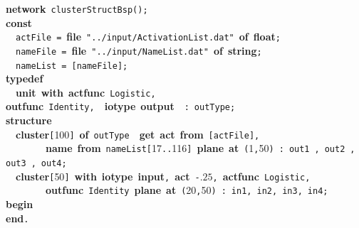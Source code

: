 {\bf network}~\verb&clusterStructBsp&\verb&(&\verb&)&\verb&;&\\[.3cm]
{\bf const}\\[.15cm]
~~\verb&actFile&~\verb&=&~{\bf file}~\verb&"../input/ActivationList.dat"&~{\bf of}~{\bf float}\verb&;&\\[.15cm]
~~\verb&nameFile&~\verb&=&~{\bf file}~\verb&"../input/NameList.dat"&~{\bf of}~{\bf string}\verb&;&\\[.15cm]
~~\verb&nameList&~\verb&=&~\verb&[&\verb&nameFile&\verb&]&\verb&;&\\[.3cm]
{\bf typedef}\\[.15cm]
~~{\bf unit}~{\bf with}~{\bf actfunc}~\verb&Logistic&\verb&,&~~{\bf
outfunc}~\verb&Identity&\verb&,&~~{\bf iotype}~{\bf output}~~\verb&:&~\verb&outType&\verb&;&\\[.3cm]
{\bf structure}\\[.15cm]
~~{\bf cluster}\verb&[&100\verb&]&~{\bf of}~\verb&outType&~~{\bf get}~{\bf act}~{\bf from}~\verb&[&\verb&actFile&\verb&]&\verb&,&~\\[.15cm]
~~~~~~~~{\bf name}~{\bf from}~\verb&nameList&\verb&[&17\verb&..&116\verb&]&~{\bf plane}~{\bf at}~\verb&(&1\verb&,&50\verb&)&~\verb&:&~\verb&out1&~\verb&,&~\verb&out2&~\verb&,&~\verb&out3&~\verb&,&~\verb&out4&\verb&;&\\[.15cm]
~~{\bf cluster}\verb&[&50\verb&]&~{\bf with}~{\bf iotype}~{\bf input}\verb&,&~{\bf act}~\verb&-&$.25$\verb&,&~{\bf actfunc}~\verb&Logistic&\verb&,&~\\[.15cm]
~~~~~~~~{\bf outfunc}~\verb&Identity&~{\bf plane}~{\bf at}~\verb&(&20\verb&,&50\verb&)&~\verb&:&~\verb&in1&\verb&,&~\verb&in2&\verb&,&~\verb&in3&\verb&,&~\verb&in4&\verb&;&\\[.3cm]
{\bf begin}\\[.15cm]
{\bf end}\verb&.&